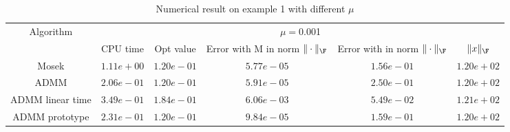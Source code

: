 \begin{table}
\centering
\begin{tabular}{|c|c|c|c|c|c|}

\hline
\multirow{2}{*}{ Algorithm} &\multicolumn{5}{c|}{$\mu=$0.001}\\\cline{2-6}
 &CPU time &Opt value &Error with M in norm $\|\cdot\|_\F$ &Error with in norm $\|\cdot\|_\F$ &$\|x\|_\F$\\\hline
Mosek & $1.11e+00$ & $1.20e-01$ & $5.77e-05$ & $1.56e-01$ & $1.20e+02$\\\hline
ADMM & $2.06e-01$ & $1.20e-01$ & $5.91e-05$ & $2.50e-01$ & $1.20e+02$\\\hline
ADMM linear time & $3.49e-01$ & $1.84e-01$ & $6.06e-03$ & $5.49e-02$ & $1.21e+02$\\\hline
ADMM prototype & $2.31e-01$ & $1.20e-01$ & $9.84e-05$ & $1.59e-01$ & $1.20e+02$\\\hline
\end{tabular}
\caption{Numerical result on example 1 with different $\mu$\label{example1}}
\end{table}
